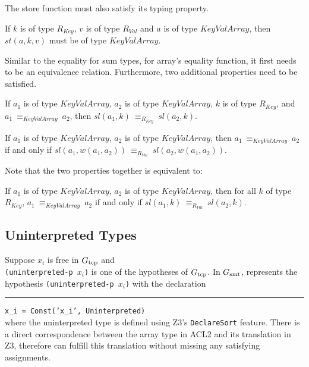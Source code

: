 \noindent The store function must also satisfy its typing property.
\begin{property}
  If $k$ is of type $R_{Key}$, $v$ is of type $R_{Val}$ and $a$ is of type
  $KeyValArray$, then $st(a, k, v)$ must be of type $KeyValArray$.
\end{property}

\noindent Similar to the equality for sum types, for array's equality function,
it first needs to be an equivalence relation. Furthermore, two additional
properties need to be satisfied.
\begin{property}
  If $a_1$ is of type $KeyValArray$, $a_2$ is of type $KeyValArray$, $k$ is of
  type $R_{Key}$, and $a_1\: \equiv_{KeyValArray}\: a_2$, then
  $sl(a_1,k)\: \equiv_{R_{Key}}\: sl(a_2,k)$.
\end{property}

\begin{property}
  If $a_1$ is of type $KeyValArray$, $a_2$ is of type $KeyValArray$, then
  $a_1\: \equiv_{KeyValArray}\: a_2$ if and only if
  $sl(a_1, w(a_1, a_2))\: \equiv_{R_{Val}}\: sl(a_2, w(a_1, a_2))$.
\end{property}

\noindent Note that the two properties together is equivalent to:
\begin{property}
  If $a_1$ is of type $KeyValArray$, $a_2$ is of type $KeyValArray$, then
  for all $k$ of type $R_{Key}$, $a_1\: \equiv_{KeyValArray}\: a_2$ if and only
  if $sl(a_1, k)\: \equiv_{R_{Val}}\: sl(a_2, k)$.
\end{property}

\subsection{Uninterpreted Types}\label{subsec:soundunintertype}
Suppose  $x_i$ is free in $G_{\mathrm{tcp}}$ and \\
\texttt{(uninterpreted-p $x_i$)} is one of
the hypotheses of $G_{\mathrm{tcp}}$. In $G_{\mathrm{smt}}$, \smtlink{} represents the hypothesis
\texttt{(uninterpreted-p $x_i$)} with the declaration\\
\rule{2em}{0ex}\texttt{x\_i = Const('x\_i', Uninterpreted)}\\
where the uninterpreted type is defined using Z3's \texttt{DeclareSort} feature.
There is a direct correspondence between the array type in ACL2 and its
translation in Z3, therefore \smtlink{} can fulfill this translation without
missing any satisfying assignments.

